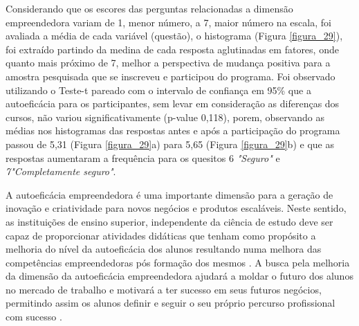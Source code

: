 Considerando que os escores das perguntas relacionadas a dimensão empreendedora variam de
1, menor número, a 7, maior número na escala,
foi avaliada a média de cada variável (questão),
o histograma (Figura \ref{figura_29}), foi extraído partindo da medina de cada resposta aglutinadas em fatores, onde quanto mais próximo de 7, melhor a perspectiva de mudança positiva para a amostra pesquisada que se inscreveu e participou do programa. Foi observado utilizando o Teste-t pareado com o intervalo de confiança em 95\%  que a autoeficácia para os participantes, sem levar em consideração as diferenças dos cursos, não variou significativamente (p-value 0,118), porem, observando as médias nos histogramas das respostas antes e após a participação do programa passou de 5,31 (Figura \ref{figura_29}a) para 5,65 (Figura \ref{figura_29}b) e que as respostas aumentaram a frequência para os quesitos 6 \textit{"Seguro"} e \textit{7"Completamente seguro"}.

A autoeficácia empreendedora é uma importante dimensão para a geração de inovação e criatividade para novos negócios e produtos escaláveis. Neste sentido, as instituições de ensino superior, independente da ciência de estudo deve ser capaz de proporcionar atividades didáticas que tenham como propósito a melhoria do nível da autoeficácia dos alunos resultando numa melhora das competências empreendedoras  pós formação dos mesmos \cite{ribeiro_autoeficacia_2019}. A busca pela melhoria da dimensão da autoeficácia empreendedora ajudará a moldar o futuro dos alunos no mercado de trabalho e motivará a ter sucesso em seus futuros negócios, permitindo assim os alunos  definir e seguir o seu próprio percurso profissional com sucesso  \cite{das_examining_2018}.

